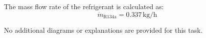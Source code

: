 The mass flow rate of the refrigerant is calculated as:  
\[
\dot{m}_{\text{R134a}} = 0.337 \, \text{kg/h}
\]  

No additional diagrams or explanations are provided for this task.